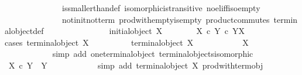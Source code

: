 \begin{isabellebody}
\ \ \ \ \ \ \ \ \ \ \ \ \ \ is{\isacharunderscore}{\kern0pt}smaller{\isacharunderscore}{\kern0pt}than{\isacharunderscore}{\kern0pt}def\ isomorphic{\isacharunderscore}{\kern0pt}is{\isacharunderscore}{\kern0pt}transitive\ no{\isacharunderscore}{\kern0pt}el{\isacharunderscore}{\kern0pt}iff{\isacharunderscore}{\kern0pt}iso{\isacharunderscore}{\kern0pt}empty\isanewline
\ \ \ \ \ \ \ \ \ \ \ \ \ \ not{\isacharunderscore}{\kern0pt}init{\isacharunderscore}{\kern0pt}not{\isacharunderscore}{\kern0pt}term\ prod{\isacharunderscore}{\kern0pt}with{\isacharunderscore}{\kern0pt}empty{\isacharunderscore}{\kern0pt}is{\isacharunderscore}{\kern0pt}empty{}\ product{\isacharunderscore}{\kern0pt}commutes\ terminal{\isacharunderscore}{\kern0pt}object{\isacharunderscore}{\kern0pt}def{\isacharparenright}{\kern0pt}\isanewline
\ \ \ \ \ \ \isamarkupfalse%
\isanewline
\ \ \ \ \ \ \isamarkupfalse%
\ {\isachardoublequoteopen}{\isasymnot}\ initial{\isacharunderscore}{\kern0pt}object\ X{\isachardoublequoteclose}\isanewline
\ \ \ \ \ \ \isamarkupfalse%
\ {\isachardoublequoteopen}X\ {\isasymtimes}\isactrlsub c\ Y\ {\isasymle}\isactrlsub c\ Y\isactrlbsup X\isactrlesup {\isachardoublequoteclose}\isanewline
\ \ \ \ \ \ \isamarkupfalse%
{\isacharparenleft}{\kern0pt}cases\ {\isachardoublequoteopen}terminal{\isacharunderscore}{\kern0pt}object\ X{\isachardoublequoteclose}{\isacharparenright}{\kern0pt}\isanewline
\ \ \ \ \ \ \ \ \isamarkupfalse%
\ {\isachardoublequoteopen}terminal{\isacharunderscore}{\kern0pt}object\ X{\isachardoublequoteclose}\isanewline
\ \ \ \ \ \ \ \ \isamarkupfalse%
\ \isamarkupfalse%
\ {\isachardoublequoteopen}X\ {\isasymcong}\ {\isasymone}{\isachardoublequoteclose}\isanewline
\ \ \ \ \ \ \ \ \ \ \isamarkupfalse%
\ {\isacharparenleft}{\kern0pt}simp\ add{\isacharcolon}{\kern0pt}\ one{\isacharunderscore}{\kern0pt}terminal{\isacharunderscore}{\kern0pt}object\ terminal{\isacharunderscore}{\kern0pt}objects{\isacharunderscore}{\kern0pt}isomorphic{\isacharparenright}{\kern0pt}\isanewline
\ \ \ \ \ \ \ \ \isamarkupfalse%
\ {\isachardoublequoteopen}X\ {\isasymtimes}\isactrlsub c\ Y\ {\isasymcong}\ Y{\isachardoublequoteclose}\isanewline
\ \ \ \ \ \ \ \ \ \ \isamarkupfalse%
\ {\isacharparenleft}{\kern0pt}simp\ add{\isacharcolon}{\kern0pt}\ {\isacartoucheopen}terminal{\isacharunderscore}{\kern0pt}object\ X{\isacartoucheclose}\ prod{\isacharunderscore}{\kern0pt}with{\isacharunderscore}{\kern0pt}term{\isacharunderscore}{\kern0pt}obj{}{\isacharparenright}{\kern0pt}\isanewline

\end{isabellebody}
